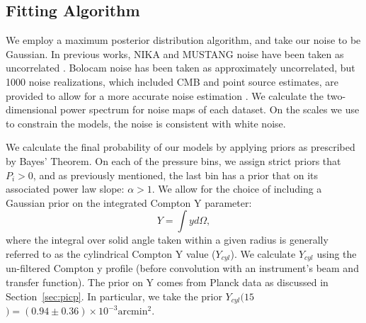 \documentclass[onecolumn,traditabstract]{aa}
\begin{document}

\subsection{Fitting Algorithm}
\label{sec:fitting}

We employ a maximum posterior distribution algorithm, and take our noise to be Gaussian.
In previous works, NIKA and MUSTANG noise have been taken as uncorrelated \citep[e.g.,][]{romero2015a,romero2017,adam2015}.
Bolocam noise has been taken as approximately uncorrelated, but 1000 noise realizations, which included CMB and point
source estimates, are provided to allow for a more accurate noise estimation \citep{sayers2011}.
We calculate the two-dimensional power spectrum for noise maps of each dataset. On the scales we use to constrain the models,
the noise is consistent with white noise.

We calculate the final probability of our models by applying priors as prescribed by Bayes' Theorem.
On each of the pressure bins, we assign strict priors that $P_i > 0$, and as previously mentioned, the last bin
has a prior that on its associated power law slope: $\alpha > 1$. We allow for the choice of including a Gaussian
prior on the integrated Compton Y parameter:
\begin{equation}
  Y = \int y d\Omega,
  \label{eqn:integrated_y}
\end{equation}
where the integral over solid angle taken within a given radius is generally referred to as the cylindrical
Compton Y value ($Y_{cyl}$). We calculate $Y_{cyl}$ using the un-filtered Compton y profile (before convolution with
an instrument's beam and transfer function). The prior on Y comes
from Planck data \citep{planck2014} as discussed in Section~\ref{sec:picp}.
In particular, we take the prior $Y_{cyl}(15$\amin$) = (0.94 \pm 0.36) \times 10^{-3} \text{arcmin}^2$.
\end{document}
